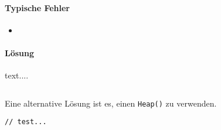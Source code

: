 \documentclass{book}
\begin{document}
\begin{lstlisting}[caption=My Javascript Example]

\end{lstlisting}

\paragraph{Typische Fehler}
\begin{itemize} 
	\item 
\end{itemize}

\paragraph{Lösung}
text....

\begin{lstlisting}[caption=My Javascript Example]

\end{lstlisting}

Eine alternative Lösung ist es, einen \lstinline|Heap()| zu verwenden.
\begin{lstlisting}[caption=My Javascript Example]
// test...

\end{lstlisting}
\end{document}
